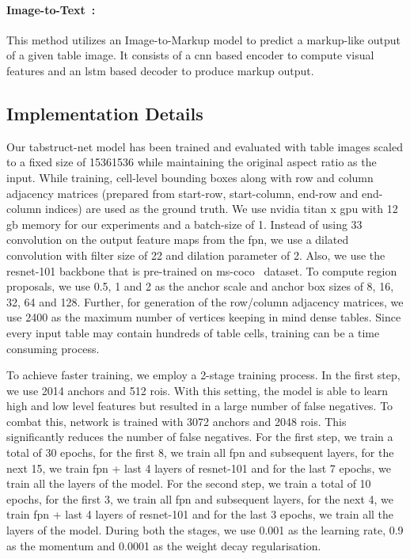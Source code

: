 \documentclass[runningheads]{llncs}
\begin{document}
\paragraph{\textbf{Image-to-Text~\cite{paliwal2019tablenet}:}} This method utilizes an Image-to-Markup model to predict a markup-like output of a given table image. It consists of a {\sc cnn} based encoder to compute visual features and an {\sc lstm} based decoder to produce markup output.

\subsection*{Implementation Details} \label{implementation_detail}

Our {\sc t}ab{\sc s}truct-{\sc n}et model has been trained and evaluated with table images scaled to a fixed size of 15361536 while maintaining the original aspect ratio as the input. While training, cell-level bounding boxes along with row and column adjacency matrices (prepared from start-row, start-column, end-row and end-column indices) are used as the ground truth. We use {\sc nvidia titan x gpu} with 12 {\sc gb} memory for our experiments and a batch-size of 1. Instead of using 33 convolution on the output feature maps from the {\sc fpn}, we use a dilated convolution with filter size of 22 and dilation parameter of 2. Also, we use the {\sc r}es{\sc n}et-101 backbone that is pre-trained on {\sc ms-coco}~\cite{smith2007overview} dataset. To compute region proposals, we use 0.5, 1 and 2 as the anchor scale and anchor box sizes of 8, 16, 32, 64 and 128. Further, for generation of the row/column adjacency matrices, we use 2400 as the maximum number of vertices keeping in mind dense tables. Since every input table may contain hundreds of table cells, training can be a time consuming process. 

To achieve faster training, we employ a 2-stage training process. In the first step, we use 2014 anchors and 512 {\sc r}o{\sc i}s. With this setting, the model is able to learn high and low level features but resulted in a large number of false negatives. To combat this, network is trained with 3072 anchors and 2048 {\sc r}o{\sc i}s. This significantly reduces the number of false negatives. For the first step, we train a total of 30 epochs, for the first 8, we train all {\sc fpn} and subsequent layers, for the next 15, we train {\sc fpn} + last 4 layers of {\sc r}es{\sc n}et-101 and for the last 7 epochs, we train all the layers of the model. For the second step, we train a total of 10 epochs, for the first 3, we train all {\sc fpn} and subsequent layers, for the next 4, we train {\sc fpn} + last 4 layers of {\sc r}es{\sc n}et-101 and for the last 3 epochs, we train all the layers of the model. During both the stages, we use 0.001 as the learning rate, 0.9 as the momentum and 0.0001 as the weight decay regularisation.
\end{document}
